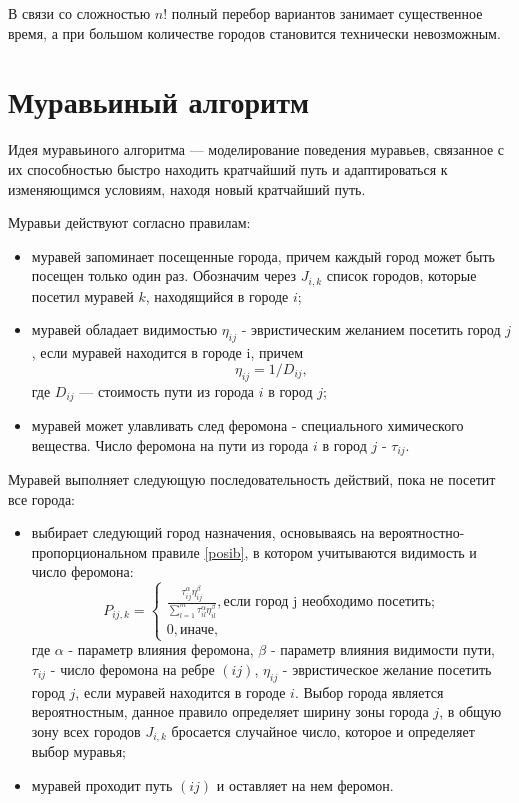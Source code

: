 В связи со сложностью $n!$ полный перебор вариантов занимает существенное время, а при большом количестве городов становится технически невозможным.

\section{Муравьиный алгоритм}

Идея муравьиного алгоритма \cite{ant} — моделирование поведения муравьев, связанное с их способностью быстро находить кратчайший путь и адаптироваться к изменяющимся условиям, находя новый кратчайший путь.

Муравьи действуют согласно правилам:
\begin{itemize}
	\item муравей запоминает посещенные города, причем каждый город может быть посещен только один раз. Обозначим через $J_{i,k}$ список городов, которые посетил муравей $k$, находящийся в городе $i$;
	\item муравей обладает видимостью $\eta_{ij}$ - эвристическим желанием посетить город $j$, если муравей находится в городе i, причем
\begin{equation}
	\label{d_func}
	\eta_{ij} = 1 / D_{ij},
\end{equation}
где $D_{ij}$ — стоимость пути из города $i$ в город $j$;
	\item муравей может улавливать след феромона - специального химического вещества. Число феромона на пути из города $i$ в город $j$ - $\tau_{ij}$.
\end{itemize}

Муравей выполняет следующую последовательность действий, пока не посетит все города:
\begin{itemize}
	\item выбирает следующий город назначения, основываясь на вероятностно-пропорциональном правиле \eqref{posib}, в котором учитываются видимость и число феромона:
\begin{equation}
	\label{posib}
	P_{ij, k} = \begin{cases}
		\frac{\tau_{ij}^\alpha\eta_{ij}^\beta}{\sum_{l=1}^m \tau^\alpha_{il}\eta^\beta_{il}}, \textrm{если город j необходимо посетить;} \\
		0, \textrm{иначе,}
	\end{cases}
\end{equation}
где $\alpha$ - параметр влияния феромона, $\beta$ - параметр влияния видимости пути, $\tau_{ij}$ - число феромона на ребре $(ij)$, $\eta_{ij}$ - эвристическое желание посетить город $j$, если муравей находится в городе $i$. Выбор города является вероятностным, данное правило определяет ширину зоны города $j$, в общую зону всех городов $J_{i,k}$ бросается случайное число, которое и определяет выбор муравья;
	\item муравей проходит путь $(ij)$ и оставляет на нем феромон.
\end{itemize}

